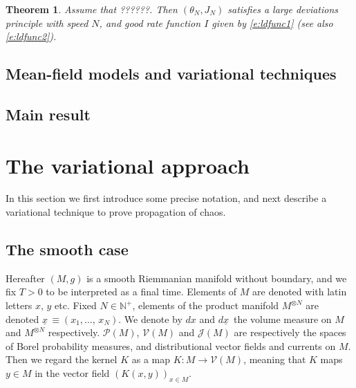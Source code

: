 \documentclass[reqno]{amsart}
\newtheorem{theorem}{Theorem}[section]
\numberwithin{equation}{section}
\numberwithin{theorem}{section}
\newcommand{\mc}[1]{{\mathcal #1}}
\newcommand{\bb}[1]{{\mathbb #1}}
\newcommand{\downbar}[1]{\underline{#1\!}\,}
\newcommand{\undx}{\downbar{x}}
\begin{document}
\begin{theorem}
\label{t:conv2}
Assume that ??????. Then $(\theta_N,J_N)$ satisfies a large deviations principle with speed $N$, and good rate function $I$ given by \eqref{e:ldfunc1} (see also \eqref{e:ldfunc2}).
\end{theorem}


\subsection{Mean-field models and variational techniques}
\label{ss:1.1}

\subsection{Main result}
\label{ss:1.2}


\section{The variational approach}
\label{s:2}
In this section we first introduce some precise notation, and next describe a variational technique to prove propagation of chaos.


\subsection{The smooth case}
\label{ss:2.1}
Hereafter $(M,g)$ is a smooth Riemmanian manifold without boundary, and we fix $T>0$ to be interpreted as a final time. Elements of $M$ are denoted with latin letters $x,\,y$ etc. Fixed $N\in \bb N^+$, elements of the product manifold $M^{\otimes N}$ are denoted $\undx\equiv (x_1,\ldots,\,x_N)$. We denote by $dx$ and $d\undx$ the volume measure on $M$ and $M^{\otimes N}$ respectively. $\mc P(M)$, $\mc V(M)$ and $\mc J(M)$ are respectively the spaces of Borel probability measures, and distributional vector fields and currents on $M$. Then we regard the kernel $K$ as a map $K\colon M\to \mc V(M)$, meaning that $K$ maps $y\in M$ in the vector field $(K(x,y))_{x\in M}$. 
\end{document}

